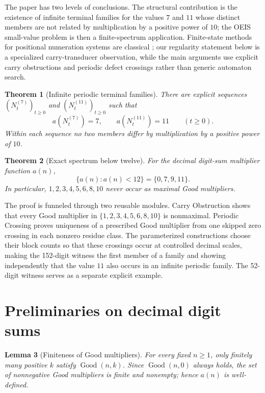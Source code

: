 \documentclass[11pt]{article}
\newtheorem{theorem}{Theorem}[section]
\newtheorem{lemma}[theorem]{Lemma}
\newcommand{\Good}{\operatorname{Good}}
\begin{document}
The paper has two levels of conclusions.  The structural contribution is the existence of infinite terminal families for the values $7$ and $11$ whose distinct members are not related by multiplication by a positive power of $10$; the OEIS small-value problem is then a finite-spectrum application.  Finite-state methods for positional numeration systems are classical \cite{frougny1992,alloucheshallit2003}; our regularity statement below is a specialized carry-transducer observation, while the main arguments use explicit carry obstructions and periodic defect crossings rather than generic automaton search.

\begin{theorem}[Infinite periodic terminal families]\label{thm:families}
There are explicit sequences $(N^{(7)}_t)_{t\ge0}$ and $(N^{(11)}_t)_{t\ge0}$ such that
\[
 a(N^{(7)}_t)=7,
 \qquad
 a(N^{(11)}_t)=11
 \qquad(t\ge0).
\]
Within each sequence no two members differ by multiplication by a positive power of $10$.
\end{theorem}

\begin{theorem}[Exact spectrum below twelve]\label{thm:main}
For the decimal digit-sum multiplier function $a(n)$,
\[
  \{a(n):a(n)<12\}=\{0,7,9,11\}.
\]
In particular, $1,2,3,4,5,6,8,10$ never occur as maximal Good multipliers.
\end{theorem}

The proof is funneled through two reusable modules.  Carry Obstruction shows that every Good multiplier in $\{1,2,3,4,5,6,8,10\}$ is nonmaximal.  Periodic Crossing proves uniqueness of a prescribed Good multiplier from one skipped zero crossing in each nonzero residue class.  The parameterized constructions choose their block counts so that these crossings occur at controlled decimal scales, making the 152-digit witness the first member of a family and showing independently that the value $11$ also occurs in an infinite periodic family.  The 52-digit witness serves as a separate explicit example.

\section{Preliminaries on decimal digit sums}

\begin{lemma}[Finiteness of Good multipliers]\label{lem:finiteness}
For every fixed $n\ge1$, only finitely many positive $k$ satisfy $\Good(n,k)$.  Since $\Good(n,0)$ always holds, the set of nonnegative Good multipliers is finite and nonempty; hence $a(n)$ is well-defined.
\end{lemma}
\end{document}
